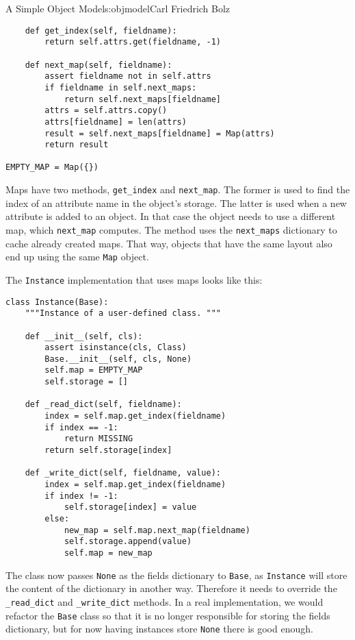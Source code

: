 \begin{aosachapter}{A Simple Object Model}{s:objmodel}{Carl Friedrich Bolz}
\begin{verbatim}
    def get_index(self, fieldname):
        return self.attrs.get(fieldname, -1)

    def next_map(self, fieldname):
        assert fieldname not in self.attrs
        if fieldname in self.next_maps:
            return self.next_maps[fieldname]
        attrs = self.attrs.copy()
        attrs[fieldname] = len(attrs)
        result = self.next_maps[fieldname] = Map(attrs)
        return result

EMPTY_MAP = Map({})
\end{verbatim}

Maps have two methods, \texttt{get\_index} and \texttt{next\_map}. The
former is used to find the index of an attribute name in the object's
storage. The latter is used when a new attribute is added to an object.
In that case the object needs to use a different map, which
\texttt{next\_map} computes. The method uses the \texttt{next\_maps}
dictionary to cache already created maps. That way, objects that have
the same layout also end up using the same \texttt{Map} object.


The \texttt{Instance} implementation that uses maps looks like this:

\begin{verbatim}
class Instance(Base):
    """Instance of a user-defined class. """

    def __init__(self, cls):
        assert isinstance(cls, Class)
        Base.__init__(self, cls, None)
        self.map = EMPTY_MAP
        self.storage = []

    def _read_dict(self, fieldname):
        index = self.map.get_index(fieldname)
        if index == -1:
            return MISSING
        return self.storage[index]

    def _write_dict(self, fieldname, value):
        index = self.map.get_index(fieldname)
        if index != -1:
            self.storage[index] = value
        else:
            new_map = self.map.next_map(fieldname)
            self.storage.append(value)
            self.map = new_map
\end{verbatim}

The class now passes \texttt{None} as the fields dictionary to
\texttt{Base}, as \texttt{Instance} will store the content of the
dictionary in another way. Therefore it needs to override the
\texttt{\_read\_dict} and \texttt{\_write\_dict} methods. In a real
implementation, we would refactor the \texttt{Base} class so that it is
no longer responsible for storing the fields dictionary, but for now
having instances store \texttt{None} there is good enough.


\end{aosachapter}
